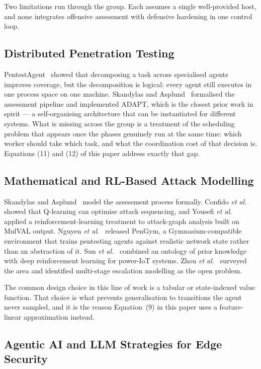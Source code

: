 \documentclass[journal]{IEEEtran}
\begin{document}
Two limitations run through the group. Each assumes a single well-provided
host, and none integrates offensive assessment with defensive hardening in one
control loop.

\subsection{Distributed Penetration Testing}

PentestAgent~\cite{shen2024} showed that decomposing a task across specialised
agents improves coverage, but the decomposition is logical: every agent still
executes in one process space on one machine. Skandylas and
Asplund~\cite{skandylas2025} formalised the assessment pipeline and
implemented ADAPT, which is the closest prior work in spirit --- a
self-organising architecture that can be instantiated for different systems.
What is missing across the group is a treatment of the scheduling problem that
appears once the phases genuinely run at the same time: which worker should
take which task, and what the coordination cost of that decision is. Equations
(11) and (12) of this paper address exactly that gap.

\subsection{Mathematical and RL-Based Attack Modelling}

Skandylas and Asplund~\cite{skandylas2025} model the assessment process
formally. Confido \emph{et al.}~\cite{confido2022} showed that Q-learning can
optimise attack sequencing, and Yousefi \emph{et al.}~\cite{yousefi2018}
applied a reinforcement-learning treatment to attack-graph analysis built on
MulVAL output. Nguyen \emph{et al.}~\cite{nguyen2025pengym} released PenGym, a
Gymnasium-compatible environment that trains pentesting agents against
realistic network state rather than an abstraction of it. Sun
\emph{et al.}~\cite{sun2025poweriot} combined an ontology of prior knowledge
with deep reinforcement learning for power-IoT systems. Zhou
\emph{et al.}~\cite{zhou2025autonomous} surveyed the area and identified
multi-stage escalation modelling as the open problem.

The common design choice in this line of work is a tabular or state-indexed
value function. That choice is what prevents generalisation to transitions the
agent never sampled, and it is the reason Equation~(9) in this paper uses a
feature-linear approximation instead.

\subsection{Agentic AI and LLM Strategies for Edge Security}
\end{document}
